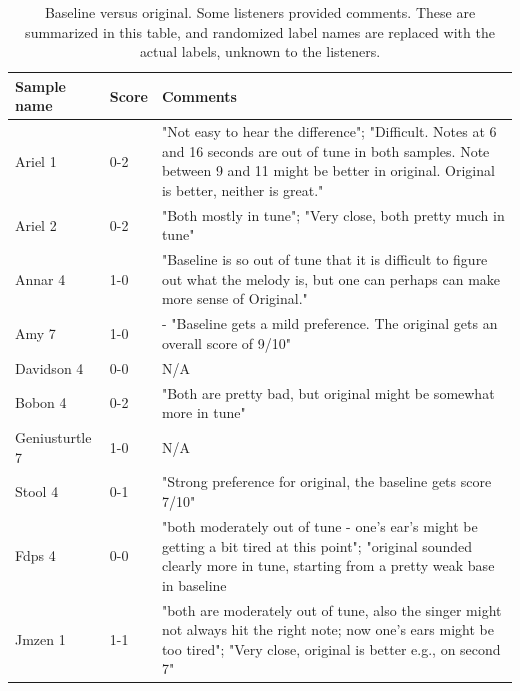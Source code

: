 \begin{table}
  \begin{center}
    \label{tab:baseline-scores}
    \begin{tabularx}{\columnwidth}{|l|l|X|}
    \hline
\textbf{Sample name} & \textbf{Score} & \textbf{Comments} \\
\hline\hline
Ariel 1 & 0-2 & "Not easy to hear the difference"; "Difficult. Notes at 6 and 16 seconds are out of tune in both samples. Note between 9 and 11 might be better in original. Original is better, neither is great."\\
\hline
Ariel 2 & 0-2 & "Both mostly in tune"; "Very close, both pretty much in tune"\\ 
\hline
Annar 4 & 1-0 & "Baseline is so out of tune that it is difficult to figure out what the melody is, but one can perhaps can make more sense of Original."\\ 
\hline
Amy 7 & 1-0 & - "Baseline gets a mild preference. The original gets an overall score of 9/10"\\
\hline
Davidson 4 & 0-0 & N/A\\ 
\hline
Bobon 4 & 0-2 & "Both are pretty bad, but original might be somewhat more in tune" \\ 
\hline
Geniusturtle 7 & 1-0 & N/A\\ 
\hline
Stool 4 & 0-1 & "Strong preference for original, the baseline gets score 7/10"\\ 
\hline
Fdps 4 & 0-0 & "both moderately out of tune - one's ear's might be getting a bit tired at this point"; "original sounded clearly more in tune, starting from a pretty weak base in baseline\\ 
\hline
Jmzen 1 & 1-1 & "both are moderately out of tune, also the singer might not always hit the right note; now one's ears might be too tired"; "Very close, original is better e.g., on second 7" \\ 
\hline
    \end{tabularx}
    \caption{Baseline versus original. Some listeners provided comments. These are summarized in this table, and randomized label names are replaced with the actual labels, unknown to the listeners.}
  \end{center}
\end{table}

